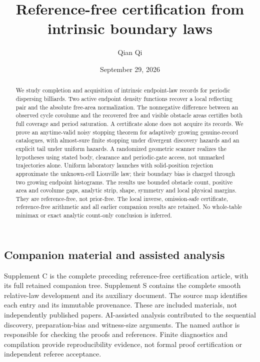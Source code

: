 \documentclass[11pt]{amsart}
\title[Reference-free certification]{Reference-free certification from intrinsic boundary laws}
\author{Qian Qi}
\date{September 29, 2026}
\theoremstyle{definition}\newtheorem{definition}[theorem]{Definition}
\theoremstyle{remark}\newtheorem{remark}[theorem]{Remark}
\numberwithin{equation}{section}
\begin{document}
\begin{abstract}
We study completion and acquisition of intrinsic endpoint-law records for
periodic dispersing billiards. Two active endpoint density functions recover
a local reflecting pair and the absolute free-area normalization. The
nonnegative difference between an observed cycle covolume and the recovered
free and visible obstacle areas certifies both full coverage and period
saturation. A certificate alone does not acquire its records. We prove an
anytime-valid noisy stopping theorem for adaptively growing genuine-record
catalogues, with almost-sure finite stopping under divergent discovery
hazards and an explicit tail under uniform hazards. A randomized geometric
scanner realizes the hypotheses using stated body, clearance and periodic-gate
access, not unmarked trajectories alone. Uniform laboratory launches with
solid-position rejection approximate the unknown-cell Liouville law; their
boundary bias is charged through two growing endpoint histograms. The
results use bounded obstacle count, positive area and covolume gaps, analytic
strip, shape, symmetry and local physical margins. They are reference-free,
not prior-free. The local inverse, omission-safe certificate, reference-free
arithmetic and all earlier companion results are retained. No whole-table
minimax or exact analytic count-only conclusion is inferred.
\end{abstract}
\maketitle








\subsection*{Companion material and assisted analysis}
Supplement C is the complete preceding reference-free certification article,
with its full retained companion tree. Supplement S contains the complete
smooth relative-law development and its auxiliary document. The source map
identifies each entry and its immutable provenance. These are included
materials, not independently published papers. AI-assisted analysis contributed
to the sequential discovery, preparation-bias and witness-size arguments.
The named author is responsible for checking the proofs and references.
Finite diagnostics and compilation provide reproducibility evidence, not
formal proof certification or independent referee acceptance.

\end{document}
